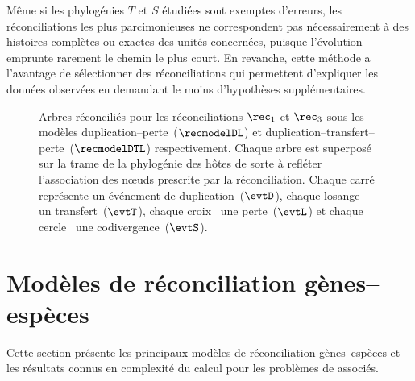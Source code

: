 Même si les phylogénies \(T\) et \(S\) étudiées sont exemptes d’erreurs, les réconciliations les plus parcimonieuses ne correspondent pas nécessairement à des histoires complètes ou exactes des unités concernées, puisque l’évolution emprunte rarement le chemin le plus court.
En revanche, cette méthode a l’avantage de sélectionner des réconciliations qui permettent d’expliquer les données observées en demandant le moins d’hypothèses supplémentaires.

\begin{figure}[htb]
    \capstart
    \centering
    
    \caption{
        Arbres réconciliés pour les réconciliations \(\rec_1\) et \(\rec_3\) sous les modèles duplication--perte~(\(\recmodelDL\)) et duplication--transfert--perte~(\(\recmodelDTL\)) respectivement.
        Chaque arbre est superposé sur la trame de la phylogénie des hôtes de sorte à refléter l’association des nœuds prescrite par la réconciliation.
        Chaque carré~{\showduplication} représente un événement de duplication~(\(\evtD\)),
        chaque losange~{\showtransfer} un transfert~(\(\evtT\)),
        chaque croix~{\showloss} une perte~(\(\evtL\))
        et chaque cercle~{\showspeciation} une codivergence~(\(\evtS\)).
    }
    \label{figure:rec-trees}
\end{figure}

\section{Modèles de réconciliation gènes--espèces}

Cette section présente les principaux modèles de réconciliation gènes--espèces et les résultats connus en complexité du calcul pour les problèmes de  associés.

